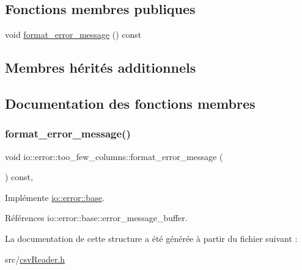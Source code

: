 \subsection*{Fonctions membres publiques}
\begin{DoxyCompactItemize}
\item 
void \hyperlink{structio_1_1error_1_1too__few__columns_a58d6d1fada127120facbcc00851ab455}{format\+\_\+error\+\_\+message} () const
\end{DoxyCompactItemize}
\subsection*{Membres hérités additionnels}


\subsection{Documentation des fonctions membres}
\mbox{\label{structio_1_1error_1_1too__few__columns_a58d6d1fada127120facbcc00851ab455}} 
\subsubsection{\texorpdfstring{format\+\_\+error\+\_\+message()}{format\_error\_message()}}
{\footnotesize\ttfamily void io\+::error\+::too\+\_\+few\+\_\+columns\+::format\+\_\+error\+\_\+message (\begin{DoxyParamCaption}{ }\end{DoxyParamCaption}) const\hspace{0.3cm}{\ttfamily [inline]}, {\ttfamily [virtual]}}



Implémente \hyperlink{structio_1_1error_1_1base_a7d9ff6a31b716a24f056cf8a3e15191d}{io\+::error\+::base}.



Références io\+::error\+::base\+::error\+\_\+message\+\_\+buffer.



La documentation de cette structure a été générée à partir du fichier suivant \+:\begin{DoxyCompactItemize}
\item 
src/\hyperlink{csvReader_8h}{csv\+Reader.\+h}\end{DoxyCompactItemize}
